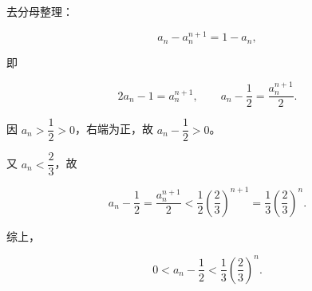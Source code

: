 \begin{answer}
去分母整理：

\nopagebreak[4]
\[
a_{n}-a_{n}^{n+1}=1-a_{n},
\]

即

\nopagebreak[4]
\[
2a_{n}-1=a_{n}^{n+1},\qquad a_{n}-\frac{1}{2}=\frac{a_{n}^{n+1}}{2}.
\]

因 $a_{n}>\dfrac{1}{2}>0$，右端为正，故 $a_{n}-\dfrac{1}{2}>0$。

又 $a_{n}<\dfrac{2}{3}$，故

\nopagebreak[4]
\[
a_{n}-\frac{1}{2}=\frac{a_{n}^{n+1}}{2}<\frac{1}{2}\left(\frac{2}{3}\right)^{n+1}=\frac{1}{3}\left(\frac{2}{3}\right)^{n}.
\]

综上，

\nopagebreak[4]
\[
0<a_{n}-\frac{1}{2}<\frac{1}{3}\left(\frac{2}{3}\right)^{n}.
\]



\end{answer}
